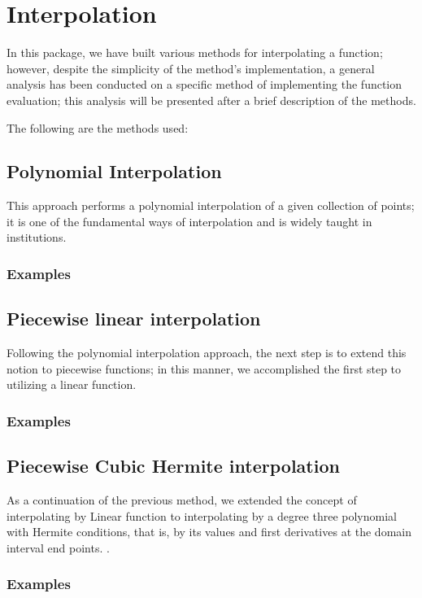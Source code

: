 \section{Interpolation}
In this package, we have built various methods for interpolating a function; however, despite the simplicity of the method's implementation, a general analysis has been conducted on a specific method of implementing the function evaluation; this analysis will be presented after a brief description of the methods.

The following are the methods used:

\subsection{Polynomial Interpolation}
This approach performs a polynomial interpolation of a given collection of points; it is one of the fundamental ways of interpolation and is widely taught in institutions.
\subsubsection{Examples}
	


\subsection{Piecewise linear interpolation}
Following the polynomial interpolation approach, the next step is to extend this notion to piecewise functions; in this manner, we accomplished the first step to utilizing a linear function.
\subsubsection{Examples}
	

\subsection{Piecewise Cubic Hermite interpolation}
As a continuation of the previous method, we extended the concept of interpolating by Linear function to interpolating by a degree three polynomial with Hermite conditions, that is, by its values and first derivatives at the domain interval end points. \cite{kreyszig11}.
\subsubsection{Examples}
	


